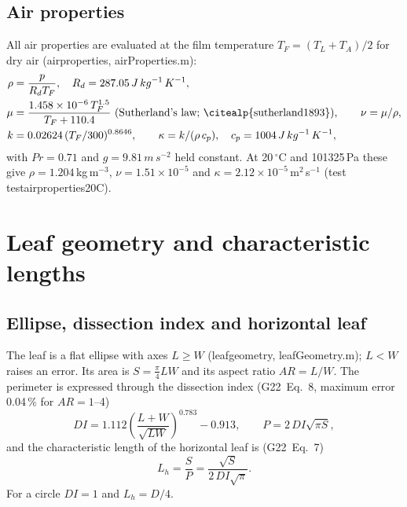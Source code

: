 \documentclass[11pt,a4paper]{article}
\newcommand{\Prn}{\mathit{Pr}}
\newcommand{\codeus}{\char95\allowbreak}
\DeclareRobustCommand{\code}[1]{\textnormal{\ttfamily\let\_\codeus #1}}
\newcommand{\Gtt}[1]{G22~Eq.~#1}
\begin{document}
\subsection{Air properties}
All air properties are evaluated at the film temperature $T_F = (T_L+T_A)/2$ for dry air (\code{air\_properties}, \code{airProperties.m}):
\begin{align}
\rho &= \frac{p}{R_d T_F}, \quad R_d = 287.05\,J\,kg\ensuremath{^{-1}}\,K\ensuremath{^{-1}},\\
\mu &= \frac{\ensuremath{1.458\times10^{-6}}\,T_F^{1.5}}{T_F + 110.4}\ \text{(Sutherland's law; \citealp{sutherland1893})},\qquad \nu = \mu/\rho,\\
k &= 0.02624\,(T_F/300)^{0.8646}, \qquad \kappa = k/(\rho\,c_p),\quad c_p = 1004\,J\,kg\ensuremath{^{-1}}\,K\ensuremath{^{-1}},
\end{align}
with $\Prn = 0.71$ and $g = 9.81\,m\,s\ensuremath{^{-2}}$ held constant. At 20\,\ensuremath{^\circ}C and 101325\,Pa these give $\rho = 1.204$\,kg\,m$^{-3}$, $\nu = \ensuremath{1.51\times10^{-5}}$ and $\kappa = \ensuremath{2.12\times10^{-5}}$\,m$^2$\,s$^{-1}$ (test \code{test\_air\_properties\_20C}).

\section{Leaf geometry and characteristic lengths}\label{sec:geometry}
\subsection{Ellipse, dissection index and horizontal leaf}
The leaf is a flat ellipse with axes $L\ge W$ (\code{leaf\_geometry}, \code{leafGeometry.m}); $L<W$ raises an error. Its area is $S = \tfrac{\pi}{4}LW$ and its aspect ratio $AR = L/W$. The perimeter is expressed through the dissection index (\Gtt{8}, maximum error 0.04\,\% for $AR = 1$--4)
\begin{equation}
DI = 1.112\left(\frac{L+W}{\sqrt{LW}}\right)^{0.783} - 0.913, \qquad P = 2\,DI\sqrt{\pi S},
\end{equation}
and the characteristic length of the horizontal leaf is (\Gtt{7})
\begin{equation}
L_h = \frac{S}{P} = \frac{\sqrt{S}}{2\,DI\sqrt{\pi}} .
\end{equation}
For a circle $DI=1$ and $L_h = D/4$.
\end{document}
